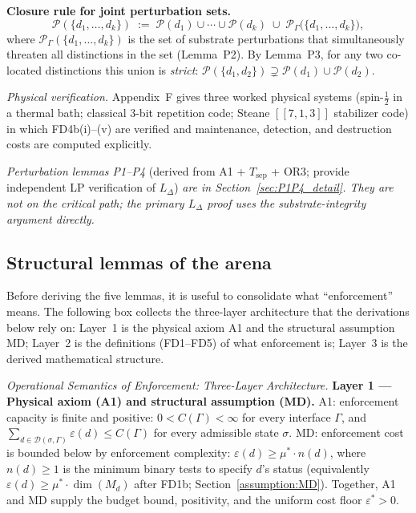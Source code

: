 \documentclass[11pt]{article}
\theoremstyle{remark}
\begin{document}
\begin{tcolorbox}[defbox, title={$\mathrm{FD4b}$ (Definition: Admissible Perturbation)}]
\smallskip\noindent\textbf{Closure rule for joint perturbation sets.}
\[
\mathcal{P}(\{d_1,\ldots,d_k\}) \;:=\; \mathcal{P}(d_1) \cup \cdots \cup \mathcal{P}(d_k) \;\cup\; \mathcal{P}_\Gamma\bigl(\{d_1,\ldots,d_k\}\bigr),
\]
where $\mathcal{P}_\Gamma(\{d_1,\ldots,d_k\})$ is the set of substrate perturbations that simultaneously threaten all distinctions in the set (Lemma~P2).  By Lemma~P3, for any two co-located distinctions this union is \emph{strict}: $\mathcal{P}(\{d_1,d_2\}) \supsetneq \mathcal{P}(d_1) \cup \mathcal{P}(d_2)$.

\smallskip\noindent\textit{Physical verification.}  Appendix~F gives three worked physical systems (spin-$\tfrac{1}{2}$ in a thermal bath; classical 3-bit repetition code; Steane $[\![7,1,3]\!]$ stabilizer code) in which FD4b(i)--(v) are verified and maintenance, detection, and destruction costs are computed explicitly.
\end{tcolorbox}

\smallskip\noindent\textit{Perturbation lemmas P1--P4} (derived from A1 + $T_{\mathrm{sep}}$ + OR3; provide independent LP verification of $L_\Delta$) \textit{are in Section~\ref{sec:P1P4_detail}.  They are not on the critical path; the primary $L_\Delta$ proof uses the substrate-integrity argument directly.}

\subsection{Structural lemmas of the arena}
\label{sec:lemmas}

Before deriving the five lemmas, it is useful to consolidate what ``enforcement'' means.  The following box collects the three-layer architecture that the derivations below rely on:  Layer~1 is the physical axiom A1 and the structural assumption MD; Layer~2 is the definitions (FD1--FD5) of what enforcement is; Layer~3 is the derived mathematical structure.


\medskip\noindent\textit{Operational Semantics of Enforcement: Three-Layer Architecture.}
\textbf{Layer 1 --- Physical axiom (A1) and structural assumption (MD).}  A1: enforcement capacity is finite and positive: $0 < C(\Gamma) < \infty$ for every interface $\Gamma$, and $\sum_{d \in \mathcal{D}(\sigma,\Gamma)} \varepsilon(d) \le C(\Gamma)$ for every admissible state $\sigma$.  MD: enforcement cost is bounded below by enforcement complexity: $\varepsilon(d) \ge \mu^* \cdot n(d)$, where $n(d) \ge 1$ is the minimum binary tests to specify $d$'s status (equivalently $\varepsilon(d) \ge \mu^* \cdot \dim(M_d)$ after FD1b; Section~\ref{assumption:MD}).  Together, A1 and MD supply the budget bound, positivity, and the uniform cost floor $\varepsilon^* > 0$.
\end{document}
